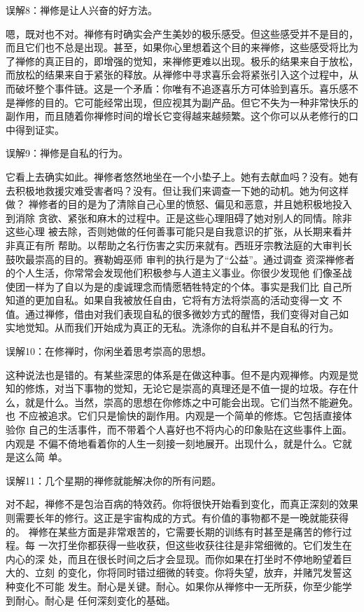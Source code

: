 \subsectnon 误解8：禅修是让人兴奋的好方法。

嗯，既对也不对。禅修有时确实会产生美妙的极乐感受。但这些感受并不是目的，
而且它们也不总是出现。甚至，如果你心里想着这个目的来禅修，这些感受将比为
了禅修的真正目的，即增强的觉知，来禅修更难以出现。极乐的结果来自于放松，
而放松的结果来自于紧张的释放。从禅修中寻求喜乐会将紧张引入这个过程中，从
而破坏整个事件链。这是一个矛盾：你唯有不追逐喜乐方可体验到喜乐。喜乐感不
是禅修的目的。它可能经常出现，但应视其为副产品。但它不失为一种非常快乐的
副作用，而且随着你禅修时间的增长它变得越来越频繁。这个你可以从老修行的口
中得到证实。

\subsectnon 误解9：禅修是自私的行为。

它看上去确实如此。禅修者悠然地坐在一个小垫子上。她有去献血吗？没有。她有
去积极地救援灾难受害者吗？没有。但让我们来调查一下她的动机。她为何这样做？
禅修者的目的是为了清除自己心里的愤怒、偏见和恶意，并且她积极地投入到消除
贪欲、紧张和麻木的过程中。\1正是这些心理阻碍了她对别人的同情。除非这些心理
被去除，否则她做的任何善事可能只是自我意识的扩张，从长期来看并非真正有所
帮助。以帮助之名行伤害之实历来就有。西班牙宗教法庭的大审判长鼓吹最崇高的目的。赛勒姆巫师
审判的执行是为了“公益”。通过调查
资深禅修者的个人生活，你常常会发现他们积极参与人道主义事业。你很少发现他
们像圣战使团一样为了自以为是的虔诚理念而情愿牺牲特定的个体。事实是我们比
自己所知道的更加自私。如果自我被放任自由，它将有方法将崇高的活动变得一文
不值。通过禅修，借由对我们表现自私的很多微妙方式的醒悟，我们变得对自己如
实地觉知。从而我们开始成为真正的无私。洗涤你的自私并不是自私的行为。

\subsectnon 误解10：在修禅时，你闲坐着思考崇高的思想。

这种说法也是错的。有某些深思的体系是在做这种事。但不是内观禅修。内观是觉
知的修炼，对当下事物的觉知，无论它是崇高的真理还是不值一提的垃圾。存在什
么，就是什么。当然，崇高的思想在你修炼之中可能会出现。它们当然不能避免。也
不应被追求。它们只是愉快的副作用。内观是一个简单的修炼。它包括直接体验你
自己的生活事件，而不带着个人喜好也不将内心的印象贴在这些事件上面。内观是
不偏不倚地看着你的人生一刻接一刻地展开。出现什么，就是什么。它就是这么简
单。

\subsectnon \1误解11：几个星期的禅修就能解决你的所有问题。

对不起，禅修不是包治百病的特效药。你将很快开始看到变化，而真正深刻的效果
则需要长年的修行。这正是宇宙构成的方式。有价值的事物都不是一晚就能获得的。
禅修在某些方面是非常艰苦的，它需要长期的训练有时甚至是痛苦的修行过程。每
一次打坐你都获得一些收获，但这些收获往往是非常细微的。它们发生在内心的深
处，而且在很长时间之后才会显现。而你如果在打坐时不停地盼望着巨大的、立刻
的变化，你将同时错过细微的转变。你将失望，放弃，并赌咒发誓这种变化不可能
发生。耐心是关键。耐心。如果你从禅修中一无所获，你至少能学到耐心。耐心是
任何深刻变化的基础。


\endchapter

\byebye
